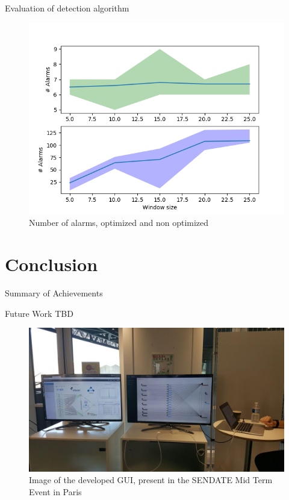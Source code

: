 \documentclass{beamer}
\begin{document}
\begin{frame}{Evaluation of detection algorithm}
    \begin{figure}
        \includegraphics[width=.9\textwidth]{meter_eleph/evaluation_error}
        \caption{Number of alarms, optimized and non optimized}
    \end{figure}
\end{frame}

\section{Conclusion}

\begin{frame}{Summary of Achievements}
\end{frame}

\begin{frame}{Future Work}
    TBD
\end{frame}

\begin{frame}{}
    \begin{figure}
        \includegraphics[width=.9\textwidth]{presentation/basebox_paris}
        \caption{Image of the developed GUI, present in the SENDATE Mid Term Event in Paris}
    \end{figure}
\end{frame}

\printbibliography
\end{document}
